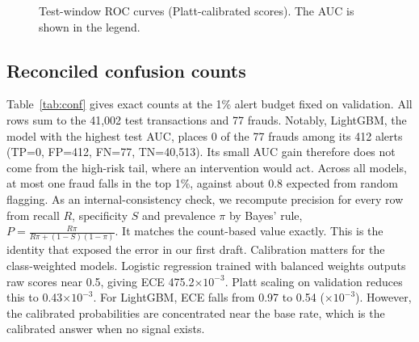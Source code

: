 \documentclass[conference]{IEEEtran}
\begin{document}
\begin{figure}[t]
\caption{Test-window ROC curves (Platt-calibrated scores). The AUC is shown in the legend.}\label{fig:roc}
\end{figure}

\subsection{Reconciled confusion counts}
Table~\ref{tab:conf} gives exact counts at the 1\% alert budget fixed on validation. All rows sum to the 41,002 test transactions and 77 frauds. Notably, LightGBM, the model with the highest test AUC, places 0 of the 77 frauds among its 412 alerts (TP=0, FP=412, FN=77, TN=40,513). Its small AUC gain therefore does not come from the high-risk tail, where an intervention would act. Across all models, at most one fraud falls in the top 1\%, against about 0.8 expected from random flagging. As an internal-consistency check, we recompute precision for every row from recall $R$, specificity $S$ and prevalence $\pi$ by Bayes' rule, $P=\frac{R\pi}{R\pi+(1-S)(1-\pi)}$. It matches the count-based value exactly. This is the identity that exposed the error in our first draft. Calibration matters for the class-weighted models. Logistic regression trained with balanced weights outputs raw scores near 0.5, giving ECE 475.2$\times10^{-3}$. Platt scaling on validation reduces this to 0.43$\times10^{-3}$. For LightGBM, ECE falls from 0.97 to 0.54 ($\times10^{-3}$). However, the calibrated probabilities are concentrated near the base rate, which is the calibrated answer when no signal exists.
\end{document}
